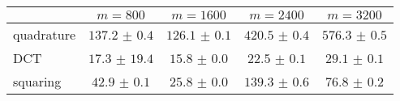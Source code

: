 \centering
\renewcommand{\arraystretch}{1.2}
\begin{tabular}{@{}lcccc@{}}
\toprule
 & $m=800$ & $m=1600$ & $m=2400$ & $m=3200$\\
\midrule
quadrature & $137.2$ $\pm$ $0.4$ & $126.1$ $\pm$ $0.1$ & $420.5$ $\pm$ $0.4$ & $576.3$ $\pm$ $0.5$ \\
DCT & $17.3$ $\pm$ $19.4$ & $15.8$ $\pm$ $0.0$ & $22.5$ $\pm$ $0.1$ & $29.1$ $\pm$ $0.1$ \\
squaring & $42.9$ $\pm$ $0.1$ & $25.8$ $\pm$ $0.0$ & $139.3$ $\pm$ $0.6$ & $76.8$ $\pm$ $0.2$ \\
\bottomrule
\end{tabular}
